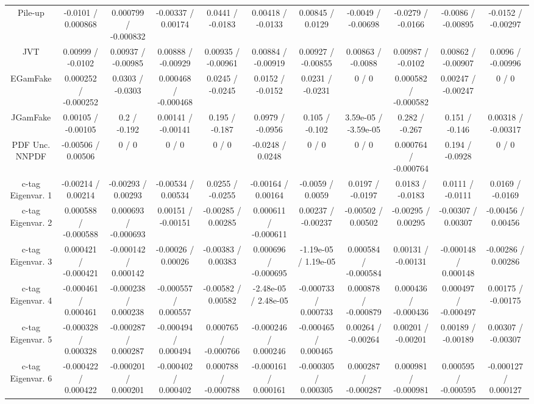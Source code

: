 \begin{table}[htbp]
\begin{center}
\begin{tabular}{|c|c|c|c|c|c|c|c|c|c|c|}
  Pile-up & -0.0101 / 0.000868 & 0.000799 / -0.000832 & -0.00337 / 0.00174 & 0.0441 / -0.0183 & 0.00418 / -0.0133 & 0.00845 / 0.0129 & -0.0049 / -0.00698 & -0.0279 / -0.0166 & -0.0086 / -0.00895 & -0.0152 / -0.00297 \\ 
  JVT & 0.00999 / -0.0102 & 0.00937 / -0.00985 & 0.00888 / -0.00929 & 0.00935 / -0.00961 & 0.00884 / -0.00919 & 0.00927 / -0.00855 & 0.00863 / -0.0088 & 0.00987 / -0.0102 & 0.00862 / -0.00907 & 0.0096 / -0.00996 \\ 
  EGamFake & 0.000252 / -0.000252 & 0.0303 / -0.0303 & 0.000468 / -0.000468 & 0.0245 / -0.0245 & 0.0152 / -0.0152 & 0.0231 / -0.0231 & 0 / 0 & 0.000582 / -0.000582 & 0.00247 / -0.00247 & 0 / 0 \\ 
  JGamFake & 0.00105 / -0.00105 & 0.2 / -0.192 & 0.00141 / -0.00141 & 0.195 / -0.187 & 0.0979 / -0.0956 & 0.105 / -0.102 & 3.59e-05 / -3.59e-05 & 0.282 / -0.267 & 0.151 / -0.146 & 0.00318 / -0.00317 \\ 
  PDF Unc. NNPDF & -0.00506 / 0.00506 & 0 / 0 & 0 / 0 & 0 / 0 & -0.0248 / 0.0248 & 0 / 0 & 0 / 0 & 0.000764 / -0.000764 & 0.194 / -0.0928 & 0 / 0 \\ 
  c-tag Eigenvar. 1 & -0.00214 / 0.00214 & -0.00293 / 0.00293 & -0.00534 / 0.00534 & 0.0255 / -0.0255 & -0.00164 / 0.00164 & -0.0059 / 0.0059 & 0.0197 / -0.0197 & 0.0183 / -0.0183 & 0.0111 / -0.0111 & 0.0169 / -0.0169 \\ 
  c-tag Eigenvar. 2 & 0.000588 / -0.000588 & 0.000693 / -0.000693 & 0.00151 / -0.00151 & -0.00285 / 0.00285 & 0.000611 / -0.000611 & 0.00237 / -0.00237 & -0.00502 / 0.00502 & -0.00295 / 0.00295 & -0.00307 / 0.00307 & -0.00456 / 0.00456 \\ 
  c-tag Eigenvar. 3 & 0.000421 / -0.000421 & -0.000142 / 0.000142 & -0.00026 / 0.00026 & -0.00383 / 0.00383 & 0.000696 / -0.000695 & -1.19e-05 / 1.19e-05 & 0.000584 / -0.000584 & 0.00131 / -0.00131 & -0.000148 / 0.000148 & -0.00286 / 0.00286 \\ 
  c-tag Eigenvar. 4 & -0.000461 / 0.000461 & -0.000238 / 0.000238 & -0.000557 / 0.000557 & -0.00582 / 0.00582 & -2.48e-05 / 2.48e-05 & -0.000733 / 0.000733 & 0.000878 / -0.000879 & 0.000436 / -0.000436 & 0.000497 / -0.000497 & 0.00175 / -0.00175 \\ 
  c-tag Eigenvar. 5 & -0.000328 / 0.000328 & -0.000287 / 0.000287 & -0.000494 / 0.000494 & 0.000765 / -0.000766 & -0.000246 / 0.000246 & -0.000465 / 0.000465 & 0.00264 / -0.00264 & 0.00201 / -0.00201 & 0.00189 / -0.00189 & 0.00307 / -0.00307 \\ 
  c-tag Eigenvar. 6 & -0.000422 / 0.000422 & -0.000201 / 0.000201 & -0.000402 / 0.000402 & 0.000788 / -0.000788 & -0.000161 / 0.000161 & -0.000305 / 0.000305 & 0.000287 / -0.000287 & 0.000981 / -0.000981 & 0.000595 / -0.000595 & -0.000127 / 0.000127 \\ 

\end{tabular}
\end{center}
\end{table}
